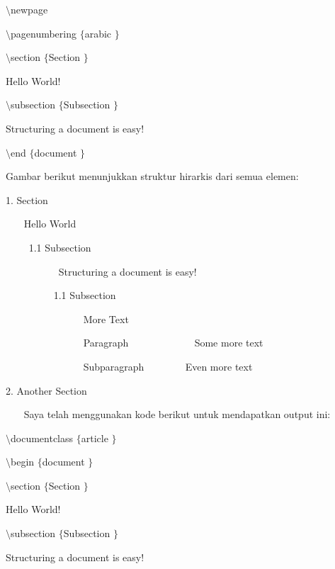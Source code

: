  $  \setminus  $newpage
 \par
 $  \setminus  $pagenumbering $  \{  $arabic $  \}  $
 \par
\vspace{12pt}
 $  \setminus  $section $  \{  $Section $  \}  $
 \par
\vspace{12pt}
Hello World!
 \par
\vspace{12pt}
 $  \setminus  $subsection $  \{  $Subsection $  \}  $
 \par
\vspace{12pt}
Structuring a document is easy!
 \par
\vspace{12pt}
 $  \setminus  $end $  \{  $document $  \}  $
 \par
\vspace{14pt}
Gambar berikut menunjukkan struktur hirarkis dari semua elemen:
 \par
1. Section
 \par
~~~ Hello World
 \par
~~~~ 1.1 Subsection
 \par
~~~~~~~~~~ Structuring a document is easy!
 \par
~~~~~~~~~ 1.1 Subsection
 \par
~~~~~~~~~~~~~~~ More Text
 \par
~~~~~~~~~~~~~~~ Paragraph ~~~~~~~~~~~~ Some more text
 \par
~~~~~~~~~~~~~~~ Subparagraph ~~~~~~~ Even more text \par
2. Another Section
 \par
~~~ Saya telah menggunakan kode berikut untuk mendapatkan output ini:
 \par
 $  \setminus  $documentclass $  \{  $article $  \}  $
 \par
\vspace{12pt}
 $  \setminus  $begin $  \{  $document $  \}  $
 \par
\vspace{12pt}
 $  \setminus  $section $  \{  $Section $  \}  $
 \par
\vspace{12pt}
Hello World!
 \par
\vspace{12pt}
 $  \setminus  $subsection $  \{  $Subsection $  \}  $
 \par
\vspace{12pt}
Structuring a document is easy!
 \par
